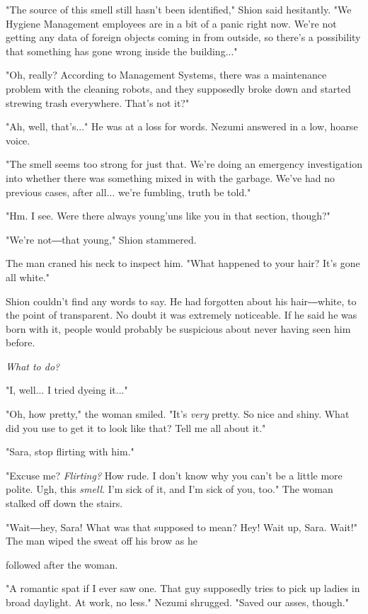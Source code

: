"The source of this smell still hasn't been identified," Shion said
hesitantly. "We Hygiene Management employees are in a bit of a panic
right now. We're not getting any data of foreign objects coming in from
outside, so there's a possibility that something has gone wrong inside
the building..."

"Oh, really? According to Management Systems, there was a maintenance
problem with the cleaning robots, and they supposedly broke down and
started strewing trash everywhere. That's not it?"

"Ah, well, that's..." He was at a loss for words. Nezumi answered in a
low, hoarse voice.

"The smell seems too strong for just that. We're doing an emergency
investigation into whether there was something mixed in with the
garbage. We've had no previous cases, after all... we're fumbling, truth
be told."

"Hm. I see. Were there always young'uns like you in that section,
though?"

"We're not―that young," Shion stammered.

The man craned his neck to inspect him. "What happened to your hair?
It's gone all white."

Shion couldn't find any words to say. He had forgotten about his
hair―white, to the point of transparent. No doubt it was extremely
noticeable. If he said he was born with it, people would probably be
suspicious about never having seen him before.

\emph{What to do?}

"I, well... I tried dyeing it..."

"Oh, how pretty," the woman smiled. "It's \emph{very} pretty. So nice and
shiny. What did you use to get it to look like that? Tell me all about
it."

"Sara, stop flirting with him."

"Excuse me? \emph{Flirting?} How rude. I don't know why you can't be a little
more polite. Ugh, this \emph{smell}. I'm sick of it, and I'm sick of you, too."
The woman stalked off down the stairs.

"Wait―hey, Sara! What was that supposed to mean? Hey! Wait up, Sara.
Wait!" The man wiped the sweat off his brow as he~

followed after the woman.

"A romantic spat if I ever saw one. That guy supposedly tries to pick up
ladies in broad daylight. At work, no less." Nezumi shrugged. "Saved our
asses, though."

